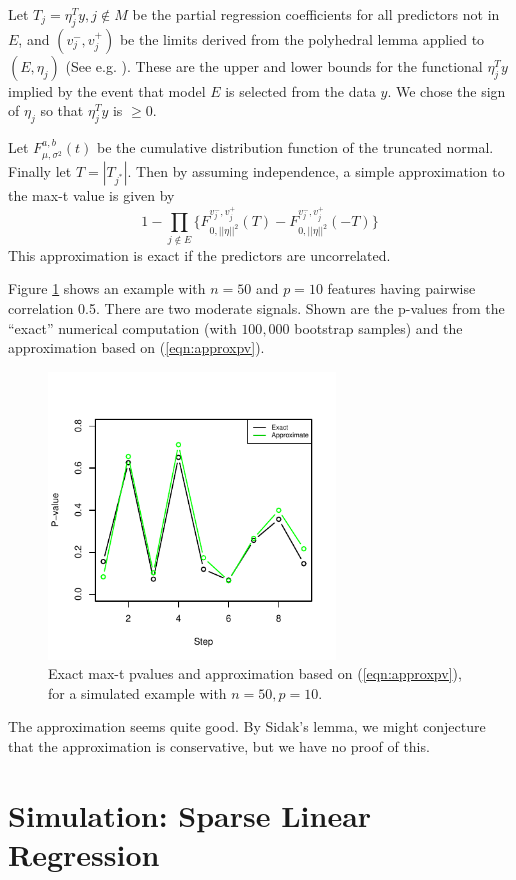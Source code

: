 \documentclass{article}
\begin{document}
Let $T_j=\eta_j^Ty, j \notin M$ be the partial regression coefficients for all predictors not in $E$,
and $(v_j^-, v_j^+)$ be the limits derived from the polyhedral lemma applied to $(E, \eta_j)$  (See e.g. \citet{spacings}).
These are the upper and lower bounds for the functional $\eta_j^Ty$ implied by the event that model $E$ is selected from the data $y$.
We chose the sign of $\eta_j$ so that $\eta_j^Ty$ is  $\geq 0$. 

 Let $F_{\mu,\sigma^2}^{a,b}(t)$ be the  cumulative distribution function of the truncated normal.
 Finally let $T=|T_{j^*}|$.
Then by assuming independence, a  simple approximation to the max-t value is given by
\begin{equation}
1-\prod_{j\notin E} \{F_{0,||\eta||^2}^{v_j^-, v_j^+}(T)-   F_{0,||\eta||^2}^{v_j^-, v_j^+}(-T) \}
\label{eqn:approxpv}
\end{equation}
This approximation is exact if the predictors are uncorrelated.

Figure \ref{fig:approxpv} shows an example with $n=50$ and $p=10$ features having pairwise correlation 0.5.
There are two moderate signals.
Shown are the p-values from the ``exact'' numerical computation (with $100,000$ bootstrap samples)
and the approximation based on (\ref{eqn:approxpv}).
\begin{figure}[htp]
\centering
  \includegraphics[width=3in]{figs/approxpv.pdf}
  \caption{Exact max-t pvalues and approximation based on (\ref{eqn:approxpv}), for a simulated example
  with $n=50, p=10$.}
  \label{fig:approxpv}
\end{figure}
The approximation seems quite good. By Sidak's lemma, we might conjecture that the approximation is conservative, but we have no proof of this.

\section{Simulation: Sparse Linear Regression}
\label{sec:sparseReg}
\end{document}
